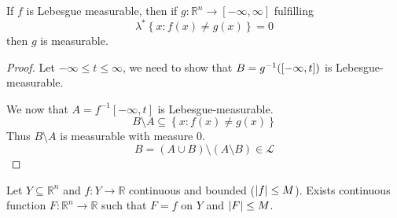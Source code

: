 \begin{lemma}
	If $f$ is Lebesgue measurable, then if $g: \mathbb{R}^n \to [-\infty,\infty]$ fulfilling
	$$\lambda^*\left\{ x : f(x) \neq g(x) \right\} = 0$$ 
	then $g$ is measurable.
	\begin{proof}
		Let $-\infty \leq t \leq \infty$, we need to show that $B=g^{-1}\qty(\qty[-\infty, t])$ is Lebesgue-measurable.
		
		We now that $A=f^{-1}[-\infty, t]$ is Lebesgue-measurable.
		$$B \setminus A \subseteq \left\{x: f(x) \neq g(x)  \right\}$$
		Thus $B\setminus A $ is measurable with measure $0$.
		$$B = (A\cup B) \setminus (A\setminus B) \in \mathcal{L}$$
	\end{proof}
\end{lemma}
\begin{theorem} \label{tietze}
	Let $Y \subseteq \mathbb{R}^n$ and $f: Y\to \mathbb{R}$ continuous and bounded ($\abs{f}\leq M$). Exists continuous function $F: \mathbb{R}^n\to \mathbb{R}$ such that $F=f$ on $Y$ and $\abs{F}\leq M$.
\end{theorem}
